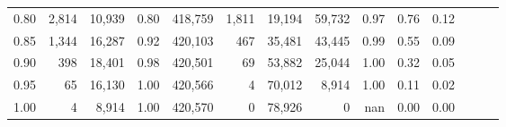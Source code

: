 \begin{tabular}{rrrrrrrrrrrrrr}
0.80 &   2,814 &  10,939 &  0.80 &  418,759 &    1,811 &  19,194 &  59,732 &  0.97 &  0.76 &      0.12 \\
0.85 &   1,344 &  16,287 &  0.92 &  420,103 &      467 &  35,481 &  43,445 &  0.99 &  0.55 &      0.09 \\
0.90 &     398 &  18,401 &  0.98 &  420,501 &       69 &  53,882 &  25,044 &  1.00 &  0.32 &      0.05 \\
0.95 &      65 &  16,130 &  1.00 &  420,566 &        4 &  70,012 &   8,914 &  1.00 &  0.11 &      0.02 \\
1.00 &       4 &   8,914 &  1.00 &  420,570 &        0 &  78,926 &       0 &   nan &  0.00 &      0.00 \\
\bottomrule
\end{tabular}
